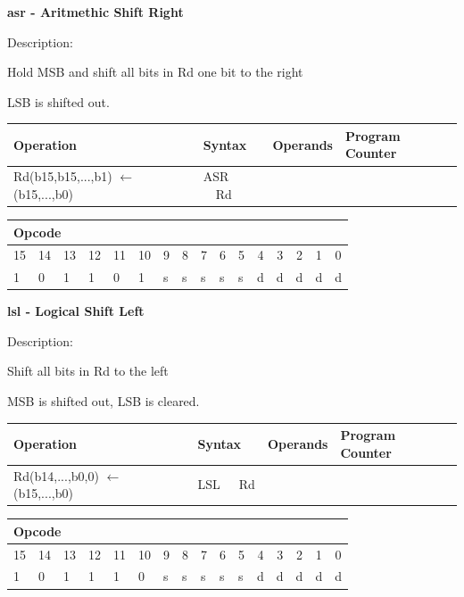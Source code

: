 \documentclass[%
	pdftex,
	a4paper,
	oneside,
	bibtotoc,%
	idxtotoc,%
	bibtotocnumbered,
	halfparskip,%
]{scrbook}
\begin{document}
\bigskip

\textbf{asr - Aritmethic Shift Right}

Description:

Hold MSB and shift all bits in Rd one bit to the right

LSB is shifted out.

\begin{tabular}{|l|l|l|l|}
\hline
Operation & Syntax & Operands & Program Counter \\ \hline
Rd(b15,b15,...,b1) $\leftarrow $ (b15,...,b0) & ASR \ \ Rd &  &  \\ \hline
\end{tabular}

\begin{tabular}{|c|c|c|c|c|c|c|c|c|c|c|c|c|c|c|c|}
\hline
\multicolumn{6}{|l|}{Opcode} & \multicolumn{5}{|l|}{} & \multicolumn{5}{|l|}{
} \\ \hline
15 & 14 & 13 & 12 & 11 & 10 & 9 & 8 & 7 & 6 & 5 & 4 & 3 & 2 & 1 & 0 \\ \hline
\multicolumn{1}{|l|}{1} & \multicolumn{1}{|l|}{0} & \multicolumn{1}{|l|}{1}
& \multicolumn{1}{|l|}{1} & \multicolumn{1}{|l|}{0} & \multicolumn{1}{|l|}{1}
& \multicolumn{1}{|l|}{s} & \multicolumn{1}{|l|}{s} & \multicolumn{1}{|l|}{s}
& \multicolumn{1}{|l|}{s} & \multicolumn{1}{|l|}{s} & \multicolumn{1}{|l|}{d}
& \multicolumn{1}{|l|}{d} & \multicolumn{1}{|l|}{d} & \multicolumn{1}{|l|}{d}
& \multicolumn{1}{|l|}{d} \\ \hline
\end{tabular}

\bigskip

\textbf{lsl - Logical Shift Left}

Description:

Shift all bits in Rd to the left

MSB is shifted out, LSB is cleared.

\begin{tabular}{|l|l|l|l|}
\hline
Operation & Syntax & Operands & Program Counter \\ \hline
Rd(b14,...,b0,0) $\leftarrow $ (b15,...,b0) & LSL\ \ \ Rd &  &  \\ \hline
\end{tabular}

\begin{tabular}{|c|c|c|c|c|c|c|c|c|c|c|c|c|c|c|c|}
\hline
\multicolumn{6}{|l|}{Opcode} & \multicolumn{5}{|l|}{} & \multicolumn{5}{|l|}{
} \\ \hline
15 & 14 & 13 & 12 & 11 & 10 & 9 & 8 & 7 & 6 & 5 & 4 & 3 & 2 & 1 & 0 \\ \hline
\multicolumn{1}{|l|}{1} & \multicolumn{1}{|l|}{0} & \multicolumn{1}{|l|}{1}
& \multicolumn{1}{|l|}{1} & \multicolumn{1}{|l|}{1} & \multicolumn{1}{|l|}{0}
& \multicolumn{1}{|l|}{s} & \multicolumn{1}{|l|}{s} & \multicolumn{1}{|l|}{s}
& \multicolumn{1}{|l|}{s} & \multicolumn{1}{|l|}{s} & \multicolumn{1}{|l|}{d}
& \multicolumn{1}{|l|}{d} & \multicolumn{1}{|l|}{d} & \multicolumn{1}{|l|}{d}
& \multicolumn{1}{|l|}{d} \\ \hline
\end{tabular}
\end{document}

